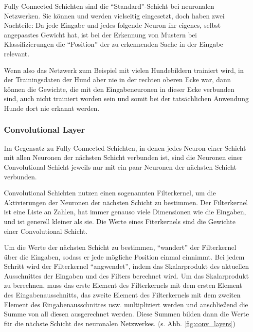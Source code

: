 \documentclass[10pt]{article}
\newcommand{\feng}[1]{{#1}}
\begin{document}
Fully Connected Schichten sind die \enquote{Standard}-Schicht bei neuronalen Netzwerken. 
Sie können und werden vielseitig eingesetzt, doch haben zwei Nachteile: 
Da jede Eingabe und jedes folgende Neuron ihr eigenes, selbst angepasstes Gewicht hat, ist bei der Erkennung von Mustern bei Klassifizierungen die \enquote{Position} der zu erkennenden Sache in der Eingabe relevant.

Wenn also das Netzwerk zum Beispiel mit vielen Hundebildern trainiert wird, in der Trainingsdaten der Hund aber nie in der rechten oberen Ecke war, dann können die Gewichte, die mit den Eingabeneuronen in dieser Ecke verbunden sind, auch nicht trainiert worden sein und somit bei der tatsächlichen Anwendung Hunde dort nie erkannt werden.


\subsubsection{Convolutional Layer}

Im Gegensatz zu Fully Connected Schichten, in denen jedes Neuron einer Schicht mit allen Neuronen der nächsten Schicht verbunden ist, sind die Neuronen einer Convolutional Schicht jeweils nur mit ein paar Neuronen der nächsten Schicht verbunden.

Convolutional Schichten nutzen einen sogenannten Filterkernel, um die Aktivierungen der Neuronen der nächsten Schicht zu bestimmen.
Der Filterkernel ist eine Liste an Zahlen, hat immer genauso viele Dimensionen wie die Eingaben, und ist generell kleiner als sie.
Die Werte eines Fiterkernels sind die Gewichte einer Convolutional Schicht.

Um die Werte der nächsten Schicht zu bestimmen, \enquote{wandert} der Filterkernel über die Eingaben, sodass er jede mögliche Position einmal einnimmt.
Bei jedem Schritt wird der Filterkernel \enquote{angwendet}, indem das Skalarprodukt des aktuellen Ausschnittes der Eingaben und des Filters berechnet wird. 
Um das Skalarprodukt zu berechnen, muss das erste Element des Filterkernels mit dem ersten Element des Eingabenausschnitts, das zweite Element des Filterkernels mit dem zweiten Element des Eingabenausschnittes usw. multipliziert werden und anschließend die Summe von all diesen ausgerechnet werden.
Diese Summen bilden dann die Werte für die nächste Schicht des neuronalen Netzwerkes. (s. Abb. \ref{fig:conv_layers})
\end{document}
